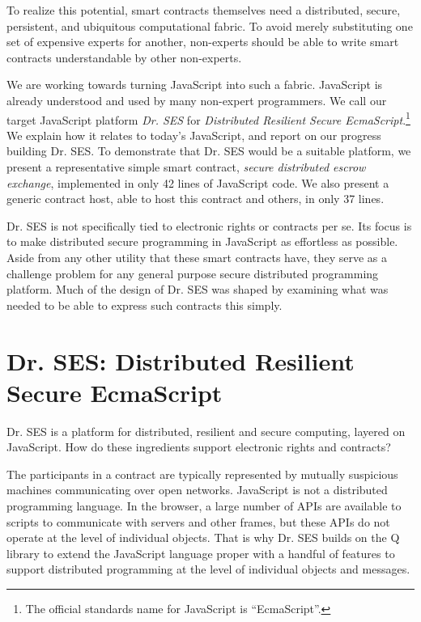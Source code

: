 \documentclass{llncs}
\begin{document}
To realize this potential, smart contracts themselves need a distributed, secure, persistent, and ubiquitous computational fabric. To avoid merely substituting one set of expensive experts for another, non-experts should be able to write smart contracts understandable by other non-experts.

We are working towards turning JavaScript into such a fabric. JavaScript is already understood and used by many non-expert programmers. We call our target JavaScript platform \emph{Dr. SES} for \emph{Distributed Resilient Secure EcmaScript}.\footnote{
%
The official standards name for JavaScript is ``EcmaScript''.
%
} We explain how it relates to today's JavaScript, and report on our progress building Dr. SES. To demonstrate that Dr. SES would be a suitable platform, we present a representative simple smart contract, \emph{secure distributed escrow exchange}, implemented in only 42 lines of JavaScript code. We also present a generic contract host, able to host this contract and others, in only 37 lines.

Dr. SES is not specifically tied to electronic rights or contracts per se. Its focus is to make distributed secure programming in JavaScript as effortless as possible. Aside from any other utility that these smart contracts have, they serve as a challenge problem for any general purpose secure distributed programming platform. Much of the design of Dr. SES
%
%
was shaped by examining what was needed to be able to express such contracts this simply. 

\section{Dr. SES: Distributed Resilient Secure EcmaScript}

Dr. SES is a platform for distributed, resilient and secure computing, layered on JavaScript. How do these ingredients support electronic rights and contracts?

The participants in a contract are typically represented by mutually suspicious machines communicating over open networks. JavaScript is not a distributed programming language. In the browser, a large number of APIs are available to scripts to communicate with servers and other frames, but these APIs do not operate at the level of individual objects. That is why Dr. SES builds on the Q library  to extend the JavaScript language proper with a handful of features to support distributed programming at the level of individual objects and messages.
\end{document}
